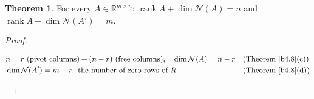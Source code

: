 \documentclass[12pt]{article}
\newcommand{\R}{\mathbb R}
\DeclareMathOperator{\rank}{rank}
\theoremstyle{definition}
\newtheorem{theorem}{Theorem}
\newcommand{\boardtop}{\vspace*{-\abovedisplayskip}}
\begin{document}
\begin{theorem}\label{b4.12}
For every \(A\in\R^{m\times n}\): \(\rank A+\dim\mathcal N(A)=n\) and \(\rank A+\dim\mathcal N(A')=m\).
\end{theorem}
\begin{proof}
\begin{board}[\(R\) as in Theorem~\ref{b4.8}, \(\rank A=r\):]
\boardtop
\begin{align*}
&n=r\ (\text{pivot columns})+(n-r)\ (\text{free columns}),\quad\dim\mathcal N(A)=n-r&&\text{(Theorem~\ref{b4.8}(c))}\\
&\dim\mathcal N(A')=m-r,\ \text{the number of zero rows of }R&&\text{(Theorem~\ref{b4.8}(d))}
\end{align*}
\end{board}
\nopagebreak
\end{proof}
\end{document}
